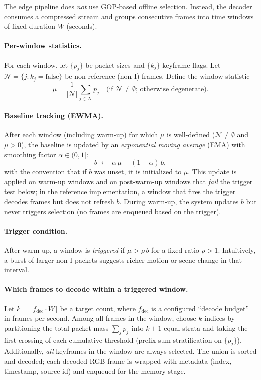 The edge pipeline does \emph{not} use GOP-based offline selection. Instead, the
decoder consumes a compressed stream and groups consecutive frames into time
windows of fixed duration $W$ (seconds).

\paragraph{Per-window statistics.}
For each window, let $\{p_j\}$ be packet sizes and $\{k_j\}$ keyframe flags.
Let $\mathcal{N} = \{ j : k_j = \text{false} \}$ be non-reference (non-I)
frames. Define the window statistic
\[
  \mu = \frac{1}{|\mathcal{N}|}\sum_{j\in\mathcal{N}} p_j
  \quad\text{(if $\mathcal{N}\neq\emptyset$; otherwise degenerate).}
\]

\paragraph{Baseline tracking (EWMA).}
After each window (including warm-up) for which $\mu$ is well-defined
($\mathcal{N}\neq\emptyset$ and $\mu>0$), the baseline is updated by an
\emph{exponential moving average} (EMA) with smoothing factor
$\alpha\in(0,1]$:
\[
  b \;\leftarrow\; \alpha\,\mu + (1-\alpha)\,b,
\]
with the convention that if $b$ was unset, it is initialized to $\mu$.
This update is applied on warm-up windows and on post-warm-up windows that
\emph{fail} the trigger test below; in the reference implementation, a window
that fires the trigger decodes frames but does not refresh $b$.
During warm-up, the system updates $b$ but never triggers selection (no frames
are enqueued based on the trigger).

\paragraph{Trigger condition.}
After warm-up, a window is \emph{triggered} if $\mu > \rho\, b$ for a fixed
ratio $\rho > 1$. Intuitively, a burst of larger non-I packets suggests richer
motion or scene change in that interval.

\paragraph{Which frames to decode within a triggered window.}
Let $k = \lceil f_{\mathrm{dec}} \cdot W \rceil$ be a target count, where
$f_{\mathrm{dec}}$ is a configured ``decode budget'' in frames per second.
Among all frames in the window, choose $k$ indices by partitioning the total
packet mass $\sum_j p_j$ into $k{+}1$ equal strata and taking the first crossing
of each cumulative threshold (prefix-sum stratification on $\{p_j\}$).
Additionally, \emph{all} keyframes in the window are always selected. The union
is sorted and decoded; each decoded RGB frame is wrapped with metadata (index,
timestamp, source id) and enqueued for the memory stage.


